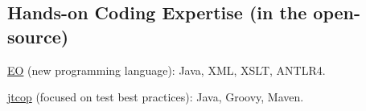 \documentclass{vl}
\begin{document}
%
%
%
%
%
%
%

    \subsection*{Hands-on Coding Expertise (in the open-source)}

    \href{https://www.eolang.org}{EO} (new programming language):
    Java, XML, XSLT, ANTLR4.

    \href{https://github.com/volodya-lombrozo/jtcop}{jtcop} (focused on test best practices):
    Java, Groovy, Maven.
\end{document}
